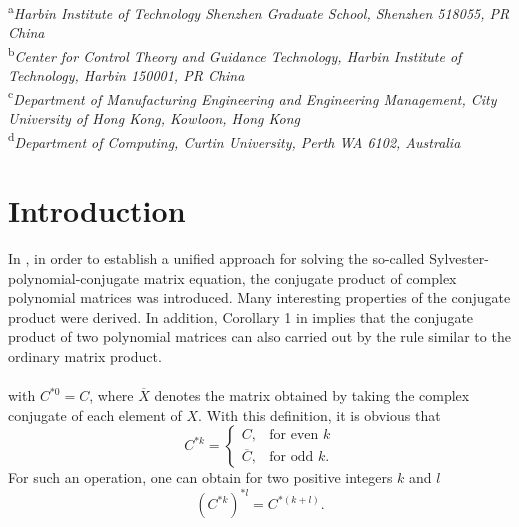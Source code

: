 \documentclass[12pt,a4paper,fleqn,twoside]{article}
\theoremstyle{plain}
\begin{document}
	{\textsuperscript{a}\label{a}}{\fontsize{8pt}{8pt}\selectfont \textit{Harbin Institute of Technology Shenzhen Graduate School, Shenzhen 518055, PR China}}\\
	{\textsuperscript{b}\label{b}}{\fontsize{8pt}{8pt}\selectfont \textit{Center for Control Theory and Guidance Technology, Harbin Institute of Technology, Harbin 150001, PR China}}\\
	{\textsuperscript{c}\label{c}}{\fontsize{8pt}{8pt}\selectfont \textit{Department of Manufacturing Engineering and Engineering Management, City University of Hong Kong, Kowloon, Hong Kong}}\\
	{\textsuperscript{d}\label{d}}{\fontsize{8pt}{8pt}\selectfont \textit{Department of Computing, Curtin University, Perth WA 6102, Australia}}
	\section{Introduction}
	In \cite{1}, in order to establish a unified approach for solving the so-called Sylvester-polynomial-conjugate matrix equation, the conjugate product of complex polynomial matrices was introduced. Many interesting properties of the conjugate product were derived. In addition, Corollary 1 in \cite{1} implies that the conjugate product of two polynomial matrices can also carried out by the rule similar to the ordinary matrix product.\\
	\\
	 with $C^{*0}=C$, where $\overline{X}$ denotes the matrix obtained by taking the complex conjugate of each element of $X$. With this definition, it is obvious that\\
	\[C^{*k}=
	\begin{cases}
		C, & \text{for even } k \\
		\overline{C}, & \text{for odd } k.
	\end{cases}\]
	For such an operation, one can obtain for two positive integers $k$ and $l$
	\begin{equation}
		(C^{*k})^{*l}=C^{*(k+l)}.
	\end{equation}
	\newpage
\end{document}
